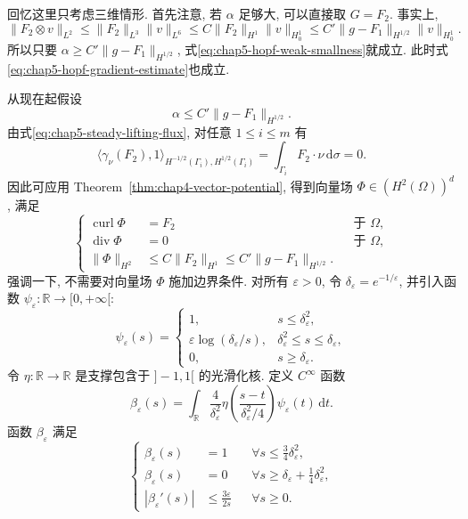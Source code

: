 \begin{Proof}
回忆这里只考虑三维情形. 首先注意, 若 $\alpha$ 足够大, 可以直接取 $G=F_2$. 事实上,
\[
 \|F_2\otimes v\|_{L^2}
 \leq\|F_2\|_{L^3}\|v\|_{L^6}
 \leq C\|F_2\|_{H^1}\|v\|_{H_0^1}
 \leq C'\|g-F_1\|_{H^{1/2}}\|v\|_{H_0^1}.
\]
所以只要 $\alpha\geq C'\|g-F_1\|_{H^{1/2}}$, 式\eqref{eq:chap5-hopf-weak-smallness}就成立. 此时式\eqref{eq:chap5-hopf-gradient-estimate}也成立.

从现在起假设
\begin{equation}
 \alpha\leq C'\|g-F_1\|_{H^{1/2}}.
\label{eq:chap5-hopf-alpha-small-case}
\end{equation}
由式\eqref{eq:chap5-steady-lifting-flux}, 对任意 $1\leq i\leq m$ 有
\[
 \langle\gamma_\nu(F_2),1\rangle_{H^{-1/2}(\Gamma_i),H^{1/2}(\Gamma_i)}
 =\int_{\Gamma_i}F_2\cdot\nu\,\mathrm d\sigma=0.
\]
因此可应用 Theorem~\ref{thm:chap4-vector-potential}, 得到向量场 $\Phi\in(H^2(\Omega))^d$, 满足
\[
 \left\{
 \begin{aligned}
 \operatorname{curl}\Phi&=F_2&&\text{于 }\Omega,\\
 \operatorname{div}\Phi&=0&&\text{于 }\Omega,\\
 \|\Phi\|_{H^2}&\leq C\|F_2\|_{H^1}
 \leq C'\|g-F_1\|_{H^{1/2}}.
 \end{aligned}
 \right.
\]
强调一下, 不需要对向量场 $\Phi$ 施加边界条件. 对所有 $\varepsilon>0$, 令 $\delta_\varepsilon=e^{-1/\varepsilon}$, 并引入函数 $\psi_\varepsilon:\mathbb R\to[0,+\infty[$:
\[
 \psi_\varepsilon(s)=
 \begin{cases}
 1,&s\leq\delta_\varepsilon^2,\\
 \varepsilon\log(\delta_\varepsilon/s),&
 \delta_\varepsilon^2\leq s\leq\delta_\varepsilon,\\
 0,&s\geq\delta_\varepsilon.
 \end{cases}
\]
令 $\eta:\mathbb R\to\mathbb R$ 是支撑包含于 $]-1,1[$ 的光滑化核. 定义 $C^\infty$ 函数
\[
 \beta_\varepsilon(s)
 =\int_{\mathbb R}\frac4{\delta_\varepsilon^2}
 \eta\!\left(\frac{s-t}{\delta_\varepsilon^2/4}\right)
 \psi_\varepsilon(t)\,\mathrm dt.
\]
函数 $\beta_\varepsilon$ 满足
\begin{equation}
\left\{
\begin{aligned}
 \beta_\varepsilon(s)&=1&&\forall s\leq\frac34\delta_\varepsilon^2,\\
 \beta_\varepsilon(s)&=0&&\forall s\geq\delta_\varepsilon+\frac14\delta_\varepsilon^2,\\
 |\beta_\varepsilon'(s)|&\leq\frac{3\varepsilon}{2s}&&\forall s\geq0.
\end{aligned}

\end{equation}
\end{Proof}
